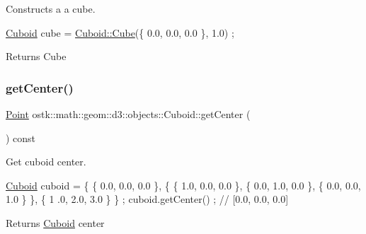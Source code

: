 Constructs a a cube. 


\begin{DoxyCode}
\hyperlink{classostk_1_1math_1_1geom_1_1d3_1_1objects_1_1_cuboid_a1da071d7cbb0a694348628f098f77c5b}{Cuboid} cube = \hyperlink{classostk_1_1math_1_1geom_1_1d3_1_1objects_1_1_cuboid_a6a42b2d344c9a6e12feef60ceea77b9d}{Cuboid::Cube}(\{ 0.0, 0.0, 0.0 \}, 1.0) ;
\end{DoxyCode}


\begin{DoxyReturn}{Returns}
Cube 
\end{DoxyReturn}
\mbox{\label{classostk_1_1math_1_1geom_1_1d3_1_1objects_1_1_cuboid_af55a54e1355ac6a50c1b9c6d0de1abd8}} 
\subsubsection{\texorpdfstring{get\+Center()}{getCenter()}}
{\footnotesize\ttfamily \hyperlink{classostk_1_1math_1_1geom_1_1d3_1_1objects_1_1_point}{Point} ostk\+::math\+::geom\+::d3\+::objects\+::\+Cuboid\+::get\+Center (\begin{DoxyParamCaption}{ }\end{DoxyParamCaption}) const}



Get cuboid center. 


\begin{DoxyCode}
\hyperlink{classostk_1_1math_1_1geom_1_1d3_1_1objects_1_1_cuboid_a1da071d7cbb0a694348628f098f77c5b}{Cuboid} cuboid = \{ \{ 0.0, 0.0, 0.0 \}, \{ \{ 1.0, 0.0, 0.0 \}, \{ 0.0, 1.0, 0.0 \}, \{ 0.0, 0.0, 1.0 \} \}, \{ 1
      .0, 2.0, 3.0 \} \} ;
cuboid.getCenter() ; \textcolor{comment}{// [0.0, 0.0, 0.0]}
\end{DoxyCode}


\begin{DoxyReturn}{Returns}
\hyperlink{classostk_1_1math_1_1geom_1_1d3_1_1objects_1_1_cuboid}{Cuboid} center 
\end{DoxyReturn}
\mbox{\label{classostk_1_1math_1_1geom_1_1d3_1_1objects_1_1_cuboid_a944ae7484ccd8c22cc6a814cb002aad8}} 

